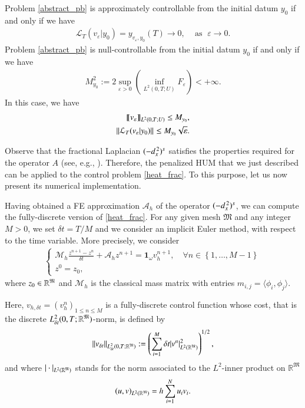 \begin{theorem}\label{theorem_hum}
Problem \eqref{abstract_pb} is approximately controllable from the initial datum $y_0$ if and only if we have
\begin{align*}
	\mathcal{L}_T(v_\varepsilon|y_0) = y_{v_\varepsilon,y_0}(T)\rightarrow 0,\;\;\;\textrm{ as }\;\varepsilon\to 0.
\end{align*}
Problem \eqref{abstract_pb} is null-controllable from the initial datum $y_0$ if and only if we have
\begin{align*}
	M_{y_0}^2:=2\sup_{\varepsilon>0}\left( \inf_{L^2(0,T;U)}F_\varepsilon\right)<+\infty.
\end{align*}
In this case, we have 
\begin{align*}
	\llbracket v_\varepsilon\rrbracket_{L^2(0,T;U)}\leq M_{y_0},\nonumber
	\\
	{\left\|\mathcal L_T(v_\varepsilon|y_0)\right\|}_{}\leq M_{y_0}\sqrt{\varepsilon}.
\end{align*} 
\end{theorem} 

Observe that the fractional Laplacian $(-d_x^{\,2})^{s}$ satisfies the properties required for the operator $A$ (see, e.g., \cite[Theorem 2.14]{gal2017nonlocal}). Therefore, the penalized HUM that we just described can be applied to the control problem \eqref{heat_frac}. To this purpose, let us now present its numerical implementation. 

Having obtained a FE approximation $\mathcal A_h$ of the operator $(-d_x^{\,2})^{s}$, we can compute the fully-discrete version of \eqref{heat_frac}. For any given mesh $\mathfrak M$ and any integer $M>0$, we set $\delta t=T/M$ and we consider an implicit Euler method, with respect to the time variable. More precisely, we consider
%
\begin{align}\label{frac_heat_num}
	\begin{cases}
		\displaystyle\mathcal M_h \frac{z^{n+1}-z^n}{\delta t}+\mathcal A_h z^{n+1}=\mathbf{1}_\omega v_h^{n+1}, \quad \forall n\in \left\{1,\ldots,M-1\right\}
		\\
		z^0=z_0, 
	\end{cases}
\end{align}
%
where $z_0\in \mathbb R^{\mathfrak{M}}$ and $\mathcal M_h$ is the classical mass matrix with entries $m_{i,j}=\langle \phi_i,\phi_j\rangle$.

Here, $v_{h,\delta t}=(v_h^n)_{1\leq n\leq M}$ is a fully-discrete control function whose cost, that is the discrete $L_{\delta t}^2(0,T;\mathbb R^{\mathfrak{M}})$-norm, is defined by
%
\begin{align*}
\|v_{\delta t}\|_{L_{\delta t}^2(0,T;\mathbb R^{\mathfrak{M}})}:=\left(\sum_{i=1}^M\delta t |v^n|^2_{L^2(\mathbb{R}^{\mathfrak{M}})}\right)^{1/2},
\end{align*}
%
and where $| \cdot |_{L^2(\mathbb{R}^{\mathfrak{M}})}$ stands for the norm associated to the $L^2$-inner product on $\mathbb{R}^\mathfrak M$
%
\begin{align*}
(u,v)_{L^2(\mathbb{R}^{\mathfrak{M}})}=h \sum_{i=1}^N u_i v_i.
\end{align*}
%

